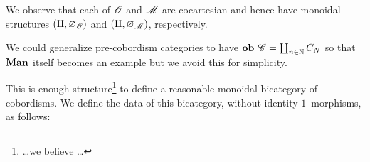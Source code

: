 \documentclass[./Thick_TQFTs_and_Quantum_Information.tex]{subfiles}
\begin{document}
\begin{rmk}
We observe that each of $\mathscr{O}$ and $\mathscr{M}$ are cocartesian and hence have
monoidal structures $(\amalg, \varnothing_{\mathscr{O}})$ and
$(\amalg, \varnothing_{\mathscr{M}})$, respectively.
\end{rmk}

\begin{rmk}
We could generalize pre-cobordism categories to have
$\textbf{ob } \mathscr{C} = \coprod_{n \in \mathbb{N}} C_N$ so that $\textbf{Man}$ itself becomes an example
but we avoid this for simplicity.
\end{rmk}

This is enough structure\footnote{\dots we believe \dots} to define a reasonable
monoidal bicategory of cobordisms. We define the data of this bicategory,
without identity $1$--morphisms, as follows:
\end{document}
